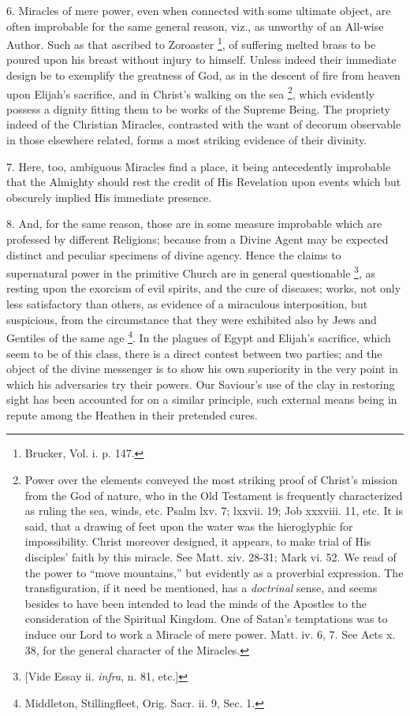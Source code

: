 6. Miracles of mere power, even when connected
with some ultimate object, are often improbable for the same
general reason, viz., as unworthy of an All-wise Author. Such as that
ascribed to Zoroaster \footnote{Brucker, Vol. i. p. 147.}, of suffering melted brass to be
poured upon his breast without injury to himself. Unless indeed their
immediate design be to exemplify the greatness of God, as in the
descent of fire from heaven upon Elijah's sacrifice, and in
Christ's walking on the sea \footnote{Power over the elements conveyed the most
striking proof of Christ's mission from the God of nature, who in
the Old Testament is frequently characterized as ruling the sea,
winds, etc. Psalm lxv. 7; lxxvii. 19; Job xxxviii. 11, etc. It is
said, that a drawing of feet upon the water was the hieroglyphic for
impossibility. Christ moreover designed, it appears, to make trial of
His disciples' faith by this miracle. See Matt. xiv. 28-31; Mark vi.
52. We read of the power to ``move mountains,'' but evidently as a
proverbial expression. The transfiguration, if it need be mentioned,
has a \emph{doctrinal} sense, and seems besides to have been intended
to lead the minds of the Apostles to the consideration of the
Spiritual Kingdom. One of Satan's temptations was to induce our Lord
to work a Miracle of mere power. Matt. iv. 6, 7. See Acts x. 38, for
the general character of the Miracles.}, which evidently possess a
dignity fitting them to be works of the Supreme Being. The propriety
indeed of the Christian Miracles, contrasted with the want of decorum
observable in those elsewhere related, forms a most striking evidence
of their divinity.

7. Here, too, ambiguous Miracles find a place, it
being antecedently improbable that the Almighty should rest the credit
of His Revelation upon events which but obscurely implied His
immediate presence.

8. And, for the same reason, those are in some
measure improbable which are professed by different Religions; because
from a Divine Agent may be expected distinct and peculiar specimens of
divine agency. Hence the claims to supernatural power in the primitive
Church are in general questionable \footnote{[Vide Essay ii. \emph{infra}, n. 81, etc.]}, as resting upon the
exorcism of evil spirits, and the cure of diseases; works, not only
less satisfactory than others, as evidence of a miraculous
interposition, but suspicious, from the circumstance that they were
exhibited also by Jews and Gentiles of the same age \footnote{Middleton, Stillingfleet, Orig. Sacr. ii. 9,
Sec. 1.}. In the
plagues of Egypt and Elijah's sacrifice, which seem to be of this
class, there is a direct contest between two parties; and the object
of the divine messenger is to show his own superiority in the very
point in which his adversaries try their powers. Our Saviour's use
of the clay in restoring sight has been accounted for on a similar
principle, such external means being in repute among the Heathen in
their pretended cures.

